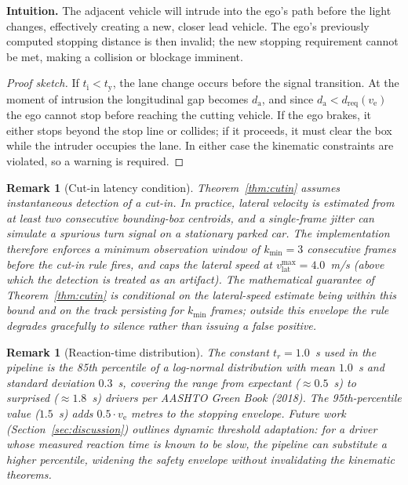 \documentclass[conference, a4paper]{IEEEtran}
\theoremstyle{plain}
\newtheorem{remark}[theorem]{Remark}
\newcommand{\dreq}{d_{\mathrm{req}}}
\newcommand{\da}{d_{\mathrm{a}}}
\newcommand{\tred}{t_{\mathrm{y}}}
\newcommand{\tint}{t_{\mathrm{i}}}
\newcommand{\ve}{v_{\mathrm{e}}}
\begin{document}
\textbf{Intuition.} The adjacent vehicle will intrude into the ego's path
before the light changes, effectively creating a new, closer lead vehicle.
The ego's previously computed stopping distance is then invalid; the new
stopping requirement cannot be met, making a collision or blockage imminent.

\begin{proof}[Proof sketch]
If $\tint < \tred$, the lane change occurs before the signal transition. At
the moment of intrusion the longitudinal gap becomes $\da$, and since
$\da < \dreq(\ve)$ the ego cannot stop before reaching the cutting vehicle.
If the ego brakes, it either stops beyond the stop line or collides; if it
proceeds, it must clear the box while the intruder occupies the lane. In
either case the kinematic constraints are violated, so a warning is required.
\end{proof}

\begin{remark}[Cut-in latency condition]
\label{rem:cutin_latency}
Theorem~\ref{thm:cutin} assumes instantaneous detection of a cut-in. In
practice, lateral velocity is estimated from at least two consecutive bounding-box
centroids, and a single-frame jitter can simulate a spurious turn signal on a
stationary parked car. The implementation therefore enforces a minimum
observation window of $k_{\min} = 3$ consecutive frames before the cut-in rule
fires, and caps the lateral speed at $v_{\mathrm{lat}}^{\max} = 4.0$~m/s
(above which the detection is treated as an artifact). The mathematical guarantee
of Theorem~\ref{thm:cutin} is conditional on the lateral-speed estimate being
within this bound and on the track persisting for $k_{\min}$ frames; outside
this envelope the rule degrades gracefully to silence rather than issuing a
false positive.
\end{remark}

\begin{remark}[Reaction-time distribution]
\label{rem:reaction_dist}
The constant $t_r = 1.0$~s used in the pipeline is the 85th percentile of a
log-normal distribution with mean $1.0$~s and standard deviation $0.3$~s,
covering the range from expectant ($\approx 0.5$~s) to surprised
($\approx 1.8$~s) drivers per AASHTO Green Book (2018). The 95th-percentile
value ($1.5$~s) adds $0.5 \cdot \ve$ metres to the stopping envelope.
Future work (Section~\ref{sec:discussion}) outlines dynamic threshold
adaptation: for a driver whose measured reaction time is known to be slow,
the pipeline can substitute a higher percentile, widening the safety
envelope without invalidating the kinematic theorems.
\end{remark}
\end{document}
